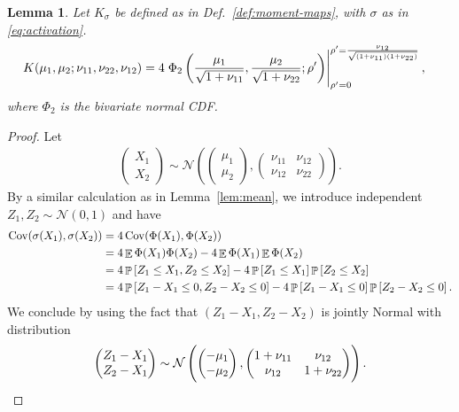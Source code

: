 \documentclass{article}
\newtheorem{lemma}{Lemma}
\DeclareMathOperator{\expect}{\mathbb{E}}
\DeclareMathOperator{\probability}{\mathbb{P}}
\DeclareMathOperator{\Cov}{\operatorname{Cov}}
\begin{document}
\begin{lemma}
  Let \(K_\sigma\) be defined as in Def.~\ref{def:moment-maps}, with
  \(\sigma\) as in \eqref{eq:activation}.
  \begin{align*}
    K(\mu_1, \mu_2; \nu_{11}, \nu_{22}, \nu_{12}) &=
    4 \left.
    \Phi_2\del{
      \frac{\mu_1}{\sqrt{1 + \nu_{11}}},
      \frac{\mu_2}{\sqrt{1 + \nu_{22}}};
      \rho'
    }
    \right|^{\rho' = \frac{\nu_{12}}{\sqrt{(1 +
    \nu_{11})(1 + \nu_{22})}}}_{\rho' = 0},
  \end{align*}
  where \(\Phi_2\) is the bivariate normal CDF.
\end{lemma}
\begin{proof}
  Let
  \begin{align}
  \begin{pmatrix} X_1 \\ X_2 \end{pmatrix}
   \sim \mathcal N\left(\begin{pmatrix}
    \mu_1
    \\
    \mu_2
  \end{pmatrix},
  \begin{pmatrix}
    \nu_{11}
    &
    \nu_{12}
    \\
    \nu_{12}
    &
    \nu_{22}
  \end{pmatrix}\right).
  \end{align}
  By a similar calculation as in Lemma~\ref{lem:mean}, we introduce independent
  \(Z_1, Z_2 \sim \mathcal N(0, 1)\) and have
  \begin{align}
    \Cov (\sigma(X_1), \sigma(X_2))
    &= 4 \Cov (\Phi(X_1), \Phi(X_2))
    \\
    &= 4\expect \Phi(X_1) \Phi (X_2) - 4\expect \Phi(X_1) \expect \Phi(X_2)
    \\
    &= 4 \probability\sbr{Z_1 \leq X_1, Z_2 \leq X_2} -
    4\probability\sbr{Z_1 \leq X_1} \probability\sbr{Z_2 \leq X_2}
    \\
    &= 4 \probability\sbr{Z_1 - X_1 \leq 0, Z_2 - X_2 \leq 0} -
    4\probability\sbr{Z_1- X_1\leq 0} \probability\sbr{Z_2 - X_2 \leq 0}.
  \end{align}
  We conclude by using the fact that \((Z_1 - X_1, Z_2 - X_2)\) is
  jointly Normal with distribution
  \begin{align}
    \begin{pmatrix}
      Z_1 - X_1
      \\
      Z_2 - X_1
    \end{pmatrix}
    \sim
    \mathcal{N}\del{
      \begin{pmatrix}
        -\mu_1
        \\
        -\mu_2
      \end{pmatrix},
      \begin{pmatrix}
        1 + \nu_{11}
        &
        \nu_{12}
        \\
        \nu_{12}
        &
        1 + \nu_{22}
      \end{pmatrix}
    }.
  \end{align}
\end{proof}
\end{document}

